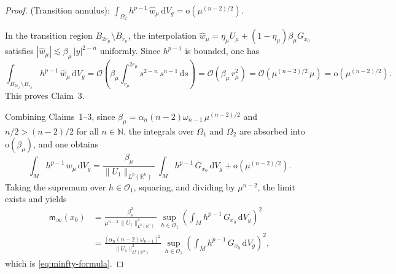 \documentclass[10pt,a4paper]{amsart}
\newcommand{\R}{\mathbb{R}}
\newcommand{\ud}{\,\mathrm{d}}
\begin{document}
\begin{proof}
\medskip
{} {\rm (Transition annulus):} {\it $\int_{\Omega_2} h^{p-1}\, \hat{w}_\mu \ud V_g = \mathrm{o}(\mu^{(n-2)/2})$.}

\smallskip
{} In the transition region $B_{2r_\mu} \setminus B_{r_\mu}$, the interpolation $\hat{w}_\mu = \eta_\mu U_\mu + (1 - \eta_\mu)\beta_\mu G_{x_0}$ satisfies $|\hat{w}_\mu| \lesssim \beta_\mu\, |y|^{2-n}$ uniformly. Since $h^{p-1}$ is bounded, one has
\[
\int_{B_{2r_\mu} \setminus B_{r_\mu}} h^{p-1}\, \hat{w}_\mu \ud V_g = \mathcal{O}\!\left(\beta_\mu \int_{r_\mu}^{2r_\mu} s^{2-n}\, s^{n-1} \ud s\right) = \mathcal{O}(\beta_\mu\, r_\mu^2) = \mathcal{O}(\mu^{(n-2)/2}\, \mu) = \mathrm{o}(\mu^{(n-2)/2}).
\]
This proves Claim~3.

\medskip
Combining Claims~1--3, since $\beta_\mu = \alpha_n(n-2)\omega_{n-1}\, \mu^{(n-2)/2}$ and 
$n/2 > (n-2)/2$ for all $n\in\mathbb{N}$,
the integrals over $\Omega_1$ and $\Omega_2$ are absorbed into $\mathrm{o}(\beta_\mu)$, and one obtains
\[
\int_M h^{p-1}\, w_\mu \ud V_g = \frac{\beta_\mu}{\|U_1\|_{L^p(\R^n)}}\, \int_M h^{p-1}\, G_{x_0} \ud V_g + \mathrm{o}(\mu^{(n-2)/2}).
\]
Taking the supremum over $h \in \mathscr{O}_1$, squaring, and dividing by $\mu^{n-2}$, the limit exists and yields
\begin{align*}
    \mathsf{m}_\infty(x_0) &= \frac{\beta_\mu^2}{\mu^{n-2}\,\|U_1\|_{L^p(\R^n)}^2}\, \sup_{h \in \mathscr{O}_1} \left(\int_M h^{p-1}\, G_{x_0} \ud V_g\right)^2 \\
    &= \frac{[\alpha_n(n-2)\omega_{n-1}]^2}{\|U_1\|_{L^p(\R^n)}^2}\, \sup_{h \in \mathscr{O}_1} \left(\int_M h^{p-1}\, G_{x_0} \ud V_g\right)^2,
\end{align*}
which is \eqref{eq:minfty-formula}.
\end{proof}
\end{document}
